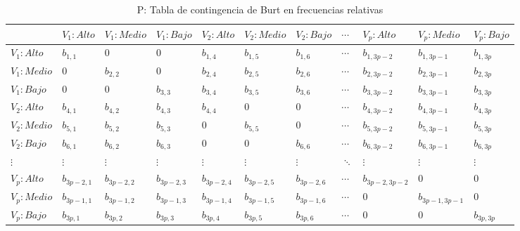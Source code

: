 \documentclass[water,article,submit,moreauthors,pdftex]{mdpi}
\begin{document}
\begin{table}[!ht]
\begin{center}
 \begin{tabular}{| p{1.7cm} ||p{1cm}p{1cm}p{1cm}||p{1cm}p{1cm} p{1cm} ||p{1cm} ||p{1.3cm} p{1cm} p{1cm} ||} 
 \hline
  & $V_{1}:Alto$ &$V_{1}:Medio$ &$V_{1}:Bajo$ & $V_{2}:Alto$ & $V_{2}:Medio$ & $V_{2}:Bajo$ & $\cdots$ & $V_{p}:Alto$ & $V_{p}:Medio$ & $V_{p}:Bajo$ \\ [0.5ex] 
 \hline\hline
 $V_{1}:Alto$ & $b_{1,1}$ & 0 & 0  & $b_{1,4}$ & $b_{1,5}$ & $b_{1,6}$ & $\cdots$ & $b_{1,3p-2}$ & $b_{1,3p-1}$ & $b_{1,3p}$ \\
 $V_{1}:Medio$ & 0 & $b_{2,2}$ & 0 & $b_{2,4}$ & $b_{2,5}$ & $b_{2,6}$ & $\cdots$ & $b_{2,3p-2}$ & $b_{2,3p-1}$ & $b_{2,3p}$ \\ 
 $V_{1}:Bajo$ & 0 & 0 & $b_{3,3}$  & $b_{3,4}$ & $b_{3,5}$ & $b_{3,6}$ & $\cdots$ & $b_{3,3p-2}$ & $b_{3,3p-1}$ & $b_{3,3p}$ \\ 
\hline\hline
  $V_{2}:Alto$ & $b_{4,1}$ & $b_{4,2}$ & $b_{4,3}$ & $b_{4,4}$ & 0 & 0 & $\cdots$ & $b_{4,3p-2}$ & $b_{4,3p-1}$ & $b_{4,3p}$ \\
 $V_{2}:Medio$ & $b_{5,1}$ & $b_{5,2}$ & $b_{5,3}$ & 0 & $b_{5,5}$ & 0 & $\cdots$ & $b_{5,3p-2}$ & $b_{5,3p-1}$ & $b_{5,3p}$ \\ 
 $V_{2}:Bajo$ &  $b_{6,1}$ & $b_{6,2}$ & $b_{6,3}$ & 0 & 0 &  $b_{6,6}$ & $\cdots$& $b_{6,3p-2}$ & $b_{6,3p-1}$ & $b_{6,3p}$ \\ 
\hline\hline
 
 $\vdots$ & $\vdots$ & $\vdots$ & $\vdots$ & $\vdots$ & $\vdots$ & $\vdots$ & $\ddots$ & $\vdots$ & $\vdots$ & $\vdots$ \\ 
 
\hline\hline
 $V_{p}:Alto$  & $b_{3p-2,1}$   & $b_{3p-2,2}$   & $b_{3p-2,3}$   & $b_{3p-2,4}$   & $b_{3p-2,5}$   & $b_{3p-2,6}$    & $\cdots$ & $b_{3p-2,3p-2}$ & 0 & 0 \\
 $V_{p}:Medio$ & $b_{3p-1,1}$ & $b_{3p-1,2}$ & $b_{3p-1,3}$ & $b_{3p-1,4}$ & $b_{3p-1,5}$ & $b_{3p-1,6}$  & $\cdots$ & 0 & $b_{3p-1,3p-1}$ & 0 \\ 
 $V_{p}:Bajo$  & $b_{3p,1}$ & $b_{3p,2}$ & $b_{3p,3}$ & $b_{3p,4}$ & $b_{3p,5}$ & $b_{3p,6}$  & $\cdots$ & 0 & 0 & $b_{3p,3p}$ \\ 
\hline
\end{tabular}
\caption{P: Tabla de contingencia de Burt en frecuencias relativas}
\label{tab:p}
\end{center}
\end{table}
\end{document}
